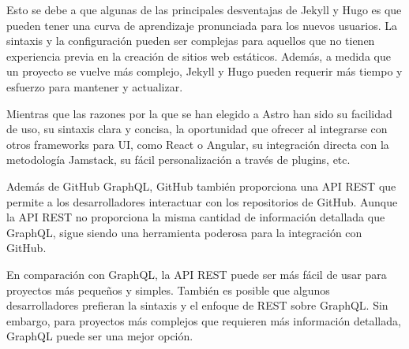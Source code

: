 Esto se debe a que algunas de las principales desventajas de Jekyll y Hugo es que pueden tener una curva de aprendizaje pronunciada para los nuevos usuarios. La sintaxis y la configuración pueden ser complejas para aquellos que no tienen experiencia previa en la creación de sitios web estáticos. Además, a medida que un proyecto se vuelve más complejo, Jekyll y Hugo pueden requerir más tiempo y esfuerzo para mantener y actualizar.

Mientras que las razones por la que se han elegido a Astro han sido su facilidad de uso, su sintaxis clara y concisa, la oportunidad que ofrecer al integrarse con otros frameworks para UI, como React\cite{react} o Angular\cite{angular}, su integración directa con la metodología Jamstack, su fácil personalización a través de plugins, etc.

Además de GitHub GraphQL, GitHub también proporciona una API REST que permite a los desarrolladores interactuar con los repositorios de GitHub. Aunque la API REST no proporciona la misma cantidad de información detallada que GraphQL, sigue siendo una herramienta poderosa para la integración con GitHub.

En comparación con GraphQL, la API REST puede ser más fácil de usar para proyectos más pequeños y simples. También es posible que algunos desarrolladores prefieran la sintaxis y el enfoque de REST sobre GraphQL. Sin embargo, para proyectos más complejos que requieren más información detallada, GraphQL puede ser una mejor opción.
